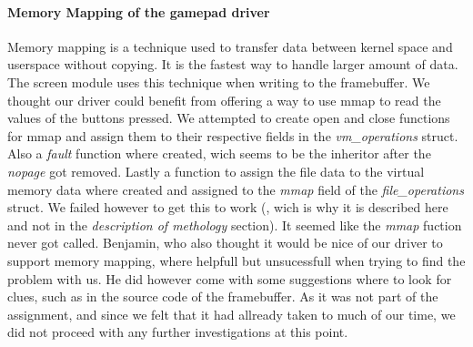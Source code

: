 \paragraph{Memory Mapping of the gamepad driver}
Memory mapping is a technique used to transfer data between kernel space and userspace without copying. It is the fastest way to handle larger amount of data. The screen module uses this technique when writing to the framebuffer. We thought our driver could benefit from offering a way to use mmap to read the values of the buttons pressed. We attempted to create open and close functions for mmap and assign them to their respective fields in the \emph{vm\_operations} struct. Also a \emph{fault} function where created, wich seems to be the inheritor after the \emph{nopage} got removed. Lastly a function to assign the file data to the virtual memory data where created and assigned to the \emph{mmap} field of the \emph{file\_operations} struct. We failed however to get this to work (, wich is why it is described here and not in the \emph{description of methology} section). It seemed like the \emph{mmap} fuction never got called. Benjamin, who also thought it would be nice of our driver to support memory mapping, where helpfull but unsucessfull when trying to find the problem with us. He did however come with some suggestions where to look for clues, such as in the source code of the framebuffer. As it was not part of the assignment, and since we felt that it had allready taken to much of our time, we did not proceed with any further investigations at this point.
